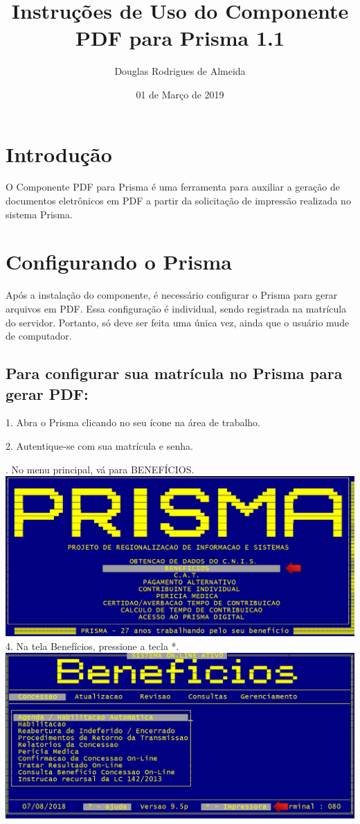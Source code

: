 \documentclass[12pt,a4paper]{article}
\title{Instruções de Uso do Componente PDF para Prisma 1.1}
\author{Douglas Rodrigues de Almeida}
\date{01 de Março de 2019}
\begin{document}
\maketitle

\section{Introdução}
O Componente PDF para Prisma é uma ferramenta para auxiliar a geração de documentos eletrônicos em PDF a partir da solicitação de impressão realizada no sistema Prisma.

\section{Configurando o Prisma}
Após a instalação do componente, é necessário configurar o Prisma para gerar arquivos em PDF. Essa configuração é individual, sendo registrada na matrícula do servidor. Portanto, só deve ser feita uma única vez, ainda que o usuário mude de computador.

\subsection{Para configurar sua matrícula no Prisma para gerar PDF:}
1. Abra o Prisma clicando no seu ícone na área de trabalho.

2. Autentique-se com sua matrícula e senha.

. No menu principal, vá para BENEFÍCIOS.\\
\includegraphics[width=1.0\textwidth, center]{menu}\\

\vspace{0.3cm}
4. Na tela Benefícios, pressione a tecla *.\\
\includegraphics[width=1.0\textwidth, center]{beneficios}\\
\end{document}
